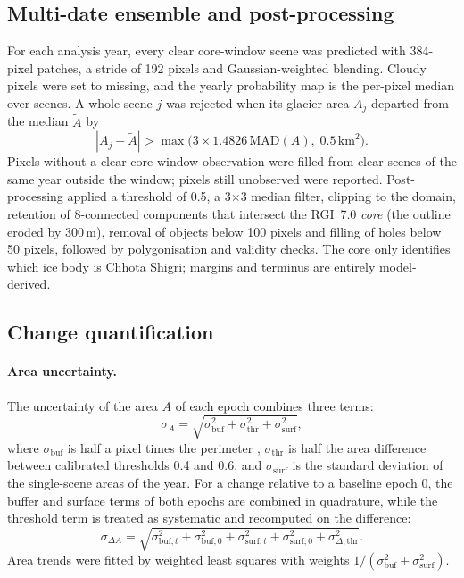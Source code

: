 \documentclass[pdflatex,sn-mathphys-num]{sn-jnl}%
\theoremstyle{thmstyleone}%
\theoremstyle{thmstyletwo}%
\theoremstyle{thmstylethree}%
\begin{document}
\subsection{Multi-date ensemble and post-processing}\label{subsec3.7}

For each analysis year, every clear core-window scene was predicted with 384-pixel patches, a stride of 192 pixels and Gaussian-weighted blending. Cloudy pixels were set to missing, and the yearly probability map is the per-pixel median over scenes. A whole scene $j$ was rejected when its glacier area $A_j$ departed from the median $\tilde{A}$ by
\begin{equation}
|A_j - \tilde{A}| > \max\bigl(3 \times 1.4826\,\mathrm{MAD}(A),\; 0.5\,\mathrm{km}^2\bigr).\label{eq:outlier}
\end{equation}
Pixels without a clear core-window observation were filled from clear scenes of the same year outside the window; pixels still unobserved were reported. Post-processing applied a threshold of 0.5, a 3$\times$3 median filter, clipping to the domain, retention of 8-connected components that intersect the RGI~7.0 \emph{core} (the outline eroded by 300\,m), removal of objects below 100 pixels and filling of holes below 50 pixels, followed by polygonisation and validity checks. The core only identifies which ice body is Chhota Shigri; margins and terminus are entirely model-derived.

\subsection{Change quantification}\label{subsec3.8}

\paragraph{Area uncertainty.} The uncertainty of the area $A$ of each epoch combines three terms:
\begin{equation}
\sigma_A = \sqrt{\sigma_\mathrm{buf}^2 + \sigma_\mathrm{thr}^2 + \sigma_\mathrm{surf}^2},\label{eq:sigmaA}
\end{equation}
where $\sigma_\mathrm{buf}$ is half a pixel times the perimeter \cite{granshaw2006}, $\sigma_\mathrm{thr}$ is half the area difference between calibrated thresholds 0.4 and 0.6, and $\sigma_\mathrm{surf}$ is the standard deviation of the single-scene areas of the year. For a change relative to a baseline epoch 0, the buffer and surface terms of both epochs are combined in quadrature, while the threshold term is treated as systematic and recomputed on the difference:
\begin{equation}
\sigma_{\Delta A} = \sqrt{\sigma_{\mathrm{buf},t}^2 + \sigma_{\mathrm{buf},0}^2 + \sigma_{\mathrm{surf},t}^2 + \sigma_{\mathrm{surf},0}^2 + \sigma_{\Delta,\mathrm{thr}}^2}.\label{eq:sigmadA}
\end{equation}
Area trends were fitted by weighted least squares with weights $1/(\sigma_\mathrm{buf}^2 + \sigma_\mathrm{surf}^2)$.
\end{document}
